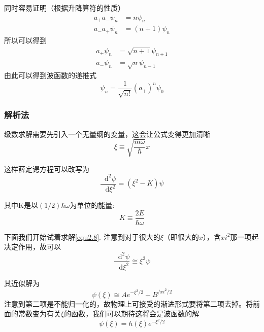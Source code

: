 \documentclass[UTF8]{ctexart}
\newcommand*{\dif}{\mathop{}\!\mathrm{d}}
\begin{document}
\noindent 同时容易证明（根据升降算符的性质）
\begin{equation}
    \begin{aligned}
        a_+ a_- \psi_n &= n \psi_n \\
        a_- a_+ \psi_n &= (n+1) \psi_n
    \end{aligned}
\end{equation}
\noindent 所以可以得到
\begin{equation}
    \begin{aligned}
        a_+ \psi_n &= \sqrt{n+1} \psi_{n+1} \\
        a_- \psi_n &= \sqrt{n} \psi_{n-1}
    \end{aligned}
\end{equation}
\noindent 由此可以得到波函数的递推式
\begin{equation}
    \psi_n = \frac{1}{\sqrt{n!}}(a_+)^{n} \psi_0\label{equ2.11}
\end{equation}

    \subsubsection{解析法}
    级数求解需要先引入一个无量纲的变量，这会让公式变得更加清晰
    \begin{equation}
        \xi \equiv \sqrt{\frac{m \omega}{\hbar}} x
    \end{equation}

\noindent 这样薛定谔方程可以改写为
\begin{equation}
    \frac{\mathop{}\!\mathrm{d}^2 \psi}{\mathop{}\!\mathrm{d} \xi^2} = (\xi^2 - K)\psi \label{equ2.8}
\end{equation}

\noindent 其中K是以$(1/2)\hbar \omega$为单位的能量:
\begin{equation}
    K \equiv \frac{2 E}{\hbar \omega}
\end{equation}

    下面我们开始试着求解\autoref{equ2.8}. 注意到对于很大的$\xi$（即很大的$x$），含$xi^2$那一项起决定作用，故可以
    \begin{equation}
        \frac{\dif^2 \psi}{\dif \xi^2} \cong \xi^2 \psi 
    \end{equation}

\noindent 其近似解为
\begin{equation}
    \psi(\xi) \cong A e^{-\xi^2/2} + B^{/xi^2/2}
\end{equation}
\noindent 注意到第二项是不能归一化的，故物理上可接受的渐进形式要将第二项去掉。将前面的常数变为有关$\xi$的函数，我们可以期待这将会是波函数的解
\begin{equation}
    \psi(\xi) = h(\xi)e^{-\xi^2/2} 
\end{equation}
\end{document}
